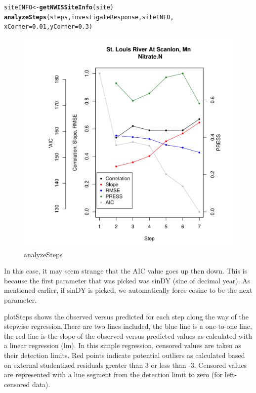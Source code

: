 \documentclass[a4paper,11pt]{article}\usepackage[]{graphicx}\usepackage[]{color}
\makeatletter
\def\maxwidth{ %
  \ifdim\Gin@nat@width>\linewidth
    \linewidth
  \else
    \Gin@nat@width
  \fi
}
\newcommand{\hlnum}[1]{\textcolor[rgb]{0.686,0.059,0.569}{#1}}%
\newcommand{\hlstd}[1]{\textcolor[rgb]{0.345,0.345,0.345}{#1}}%
\newcommand{\hlkwb}[1]{\textcolor[rgb]{0.69,0.353,0.396}{#1}}%
\newcommand{\hlkwc}[1]{\textcolor[rgb]{0.333,0.667,0.333}{#1}}%
\newcommand{\hlkwd}[1]{\textcolor[rgb]{0.737,0.353,0.396}{\textbf{#1}}}%
\newenvironment{kframe}{%
 \def\at@end@of@kframe{}%
 \ifinner\ifhmode%
  \def\at@end@of@kframe{\end{minipage}}%
  \begin{minipage}{\columnwidth}%
 \fi\fi%
 \def\FrameCommand##1{\hskip\@totalleftmargin \hskip-\fboxsep
 \colorbox{shadecolor}{##1}\hskip-\fboxsep
     \hskip-\linewidth \hskip-\@totalleftmargin \hskip\columnwidth}%
 \MakeFramed {\advance\hsize-\width
   \@totalleftmargin\z@ \linewidth\hsize
   \@setminipage}}%
 {\par\unskip\endMakeFramed%
 \at@end@of@kframe}
\newenvironment{knitrout}{}{} %
\makeatother
\begin{document}
\begin{knitrout}
\color{fgcolor}\begin{kframe}
\begin{alltt}
\hlstd{siteINFO} \hlkwb{<-} \hlkwd{getNWISSiteInfo}\hlstd{(site)}
\hlkwd{analyzeSteps}\hlstd{(steps, investigateResponse,siteINFO,}
             \hlkwc{xCorner}\hlstd{=}\hlnum{0.01}\hlstd{,}\hlkwc{yCorner}\hlstd{=}\hlnum{0.3}\hlstd{)}
\end{alltt}
\end{kframe}\begin{figure}[]

\includegraphics[width=\maxwidth]{figure/analyzeSteps} \caption[analyzeSteps]{analyzeSteps\label{fig:analyzeSteps}}
\end{figure}


\end{knitrout}

In this case, it may seem strange that the AIC value goes up then down. This is because the first parameter that was picked was sinDY (sine of decimal year). As mentioned earlier, if sinDY is picked, we automatically force cosine to be the next parameter. 

\FloatBarrier

plotSteps shows the observed versus predicted for each step along the way of the stepwise regression.There are two lines included, the blue line is a one-to-one line, the red line is the slope of the observed versus predicted values as calculated with a linear regression (lm). In this simple regression, censored values are taken as their detection limits. Red points indicate potential outliers as calculated based on external studentized residuals greater than 3 or less than -3. Censored values are represented with a line segment from the detection limit to zero (for left-censored data).
\end{document}
